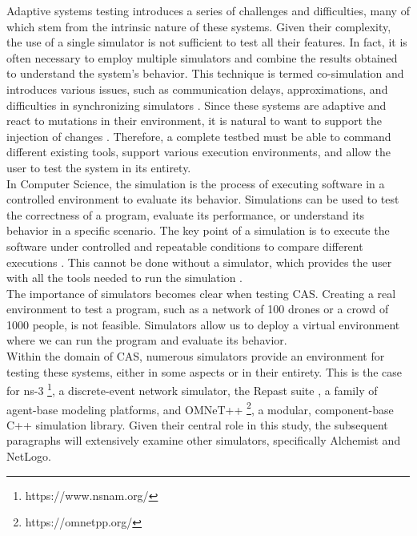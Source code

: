 \documentclass[12pt,a4paper,openright,twoside]{book}
\begin{document}
Adaptive systems testing introduces a series of challenges and difficulties, many of which stem from the intrinsic nature of these systems.
Given their complexity, the use of a single simulator is not sufficient to test all their features.
In fact, it is often necessary to employ multiple simulators and combine the results obtained to understand the system's behavior.
This technique is termed co-simulation and introduces various issues, such as communication delays, approximations, and difficulties in synchronizing simulators \cite{DBLP:journals/simpra/ThuleLGML19}.
Since these systems are adaptive and react to mutations in their environment, it is natural to want to support the injection of changes \cite{DBLP:conf/icac/BrownHHLLSY04}.
Therefore, a complete testbed must be able to command different existing tools, support various execution environments, and allow the user to test the system in its entirety. \\

In Computer Science, the simulation is the process of executing software in a controlled environment to evaluate its behavior.
Simulations can be used to test the correctness of a program, evaluate its performance, or understand its behavior in a specific scenario.
The key point of a simulation is to execute the software under controlled and repeatable conditions to compare different executions  \cite{DBLP:journals/cacm/CollbergP16}.
This cannot be done without a simulator, which provides the user with all the tools needed to run the simulation  \cite{argun2021simulation, bagrodia1998parsec}. \\
The importance of simulators becomes clear when testing \ac{CAS}.
Creating a real environment to test a program, such as a network of 100 drones or a crowd of 1000 people, is not feasible.
Simulators allow us to deploy a virtual environment where we can run the program and evaluate its behavior. \\

Within the domain of \ac*{CAS}, numerous simulators provide an environment for testing these systems, either in some aspects or in their entirety.
This is the case for ns-3 \footnote{https://www.nsnam.org/}, a discrete-event network simulator, the Repast suite \cite{North2013}, a family of agent-base modeling platforms, and OMNeT++ \footnote{https://omnetpp.org/}, a modular, component-base C++ simulation library.
Given their central role in this study, the subsequent paragraphs will extensively examine other simulators, specifically Alchemist and NetLogo.
\end{document}
